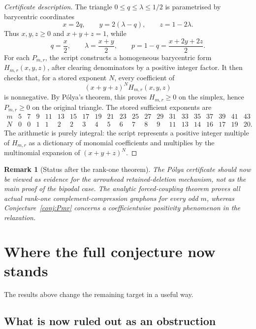 \documentclass[11pt]{article}
\newtheorem{remark}[theorem]{Remark}
\begin{document}
\begin{proof}[Certificate description]
The triangle $0\le q\le\lambda\le1/2$ is parametrised by barycentric coordinates
\[
        x=2q,
        \qquad
        y=2(\lambda-q),
        \qquad
        z=1-2\lambda.
\]
Thus $x,y,z\ge0$ and $x+y+z=1$, while
\[
        q=\frac{x}{2},
        \qquad
        \lambda=\frac{x+y}{2},
        \qquad
        p=1-q=\frac{x+2y+2z}{2}.
\]
For each $P_{m,r}$, the script constructs a homogeneous barycentric form $H_{m,r}(x,y,z)$, after clearing denominators by a positive integer factor.  It then checks that, for a stored exponent $N$, every coefficient of
\[
        (x+y+z)^N H_{m,r}(x,y,z)
\]
is nonnegative.  By P\'olya's theorem, this proves $H_{m,r}\ge0$ on the simplex, hence $P_{m,r}\ge0$ on the original triangle.  The stored sufficient exponents are
\[
\begin{array}{c|cccccccccccccccccccc}
 m&5&7&9&11&13&15&17&19&21&23&25&27&29&31&33&35&37&39&41&43\\
 \hline
 N&0&0&1&1&2&2&3&4&5&6&7&8&9&11&13&14&16&17&19&20.
\end{array}
\]
The arithmetic is purely integral: the script represents a positive integer multiple of $H_{m,r}$ as a dictionary of monomial coefficients and multiplies by the multinomial expansion of $(x+y+z)^N$.
\end{proof}

\begin{remark}[Status after the rank-one theorem]
The P\'olya certificate should now be viewed as evidence for the arrowhead retained-deletion mechanism, not as the main proof of the bipodal case.  The analytic forced-coupling theorem proves all actual rank-one complement-compression graphons for every odd $m$, whereas Conjecture~\ref{conj:Pmr} concerns a coefficientwise positivity phenomenon in the relaxation.
\end{remark}

\section{Where the full conjecture now stands}

The results above change the remaining target in a useful way.

\subsection{What is now ruled out as an obstruction}
\end{document}
